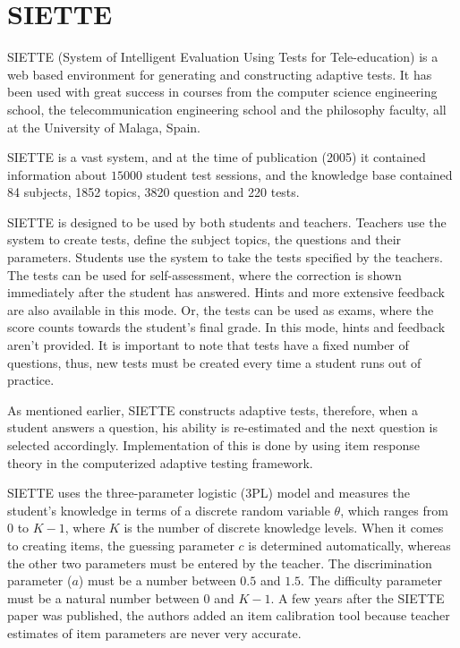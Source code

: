 \section{SIETTE}
\label{sec:SIETTE}
SIETTE\cite{SIETTE-small} (System of Intelligent Evaluation Using Tests for Tele-education) is a web based environment for generating and constructing adaptive tests. It has been used with great success in courses from the computer science engineering school, the telecommunication engineering school and the philosophy faculty, all at the University of Malaga, Spain.\newline

SIETTE is a vast system, and at the time of publication (2005) it contained information about $15000$ student test sessions, and the knowledge base contained 84 subjects, 1852 topics, 3820 question and 220 tests.\newline

SIETTE is designed to be used by both students and teachers. Teachers use the system to create tests, define the subject topics, the questions and their parameters. Students use the system to take the tests specified by the teachers. The tests can be used for self-assessment, where the correction is shown immediately after the student has answered. Hints and more extensive feedback are also available in this mode. Or, the tests can be used as exams, where the score counts towards the student's final grade. In this mode, hints and feedback aren't provided. It is important to note that tests have a fixed number of questions, thus, new tests must be created every time a student runs out of practice.\newline

As mentioned earlier, SIETTE constructs adaptive tests, therefore, when a student answers a question, his ability is re-estimated and the next question is selected accordingly. Implementation of this is done by using item response theory in the computerized adaptive testing framework.\newline

SIETTE uses the three-parameter logistic (3PL) model and measures the student's knowledge in terms of a discrete random variable $\theta$, which ranges from 0 to $K-1$, where $K$ is the number of discrete knowledge levels. When it comes to creating items, the guessing parameter $c$ is determined automatically, whereas the other two parameters must be entered by the teacher. The discrimination parameter ($a$) must be a number between $0.5$ and $1.5$. The difficulty parameter must be a natural number between 0 and $K-1$. A few years after the SIETTE paper was published, the authors added an item calibration tool because teacher estimates of item parameters are never very accurate.\newline

